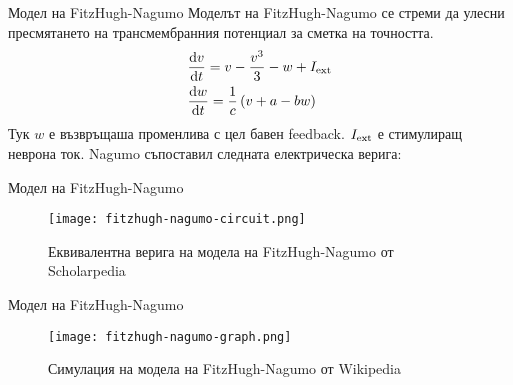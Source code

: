 \begin{frame}[t]{Модел на FitzHugh-Nagumo}
  Моделът на FitzHugh-Nagumo се стреми да улесни пресмятането на трансмембранния потенциал за сметка на точността.
  \begin{align*}
    &\dv{v}{t} = v - \frac{v^{3}}{3} - w + I_{\rm{ext}} \\
    &\dv{w}{t} = \frac{1}{c}\left(v + a - bw\right)
  \end{align*}
  Тук $w$ е възвръщаша променлива с цел бавен feedback. 
  $I_{\rm{ext}}$ е стимулиращ неврона ток.
  Nagumo съпоставил следната електрическа верига:
\end{frame}

\begin{frame}[t]{Модел на FitzHugh-Nagumo}
  \begin{figure}[htbp!]
    \centering
    \texttt{[image: fitzhugh-nagumo-circuit.png]}
    \caption{Еквивалентна верига на модела на FitzHugh-Nagumo от Scholarpedia}
  \end{figure}  
\end{frame}

\begin{frame}[t]{Модел на FitzHugh-Nagumo}
  \begin{figure}[htbp!]
    \centering
    \texttt{[image: fitzhugh-nagumo-graph.png]}
    \caption{Симулация на модела на FitzHugh-Nagumo от Wikipedia}
  \end{figure}  
\end{frame}